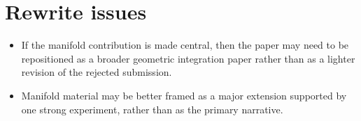 \documentclass{article}
\begin{document}
\section{Rewrite issues}
\begin{itemize}
    \item If the manifold contribution is made central, then the paper may need to be repositioned as a broader geometric integration paper rather than as a lighter revision of the rejected submission.
    
    \item Manifold material may be better framed as a major extension supported by one strong experiment, rather than as the primary narrative.
\end{itemize}



\end{document}
